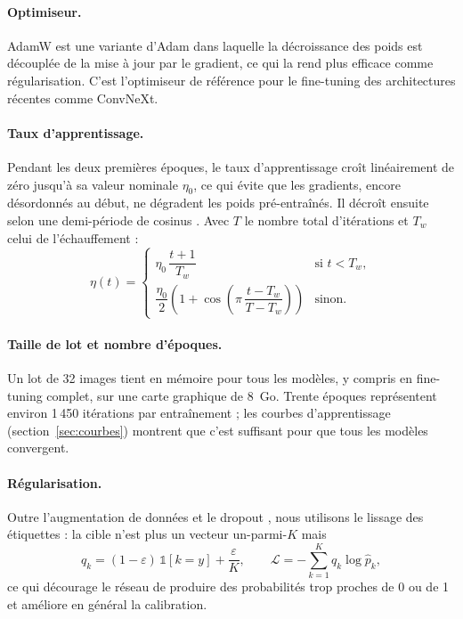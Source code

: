 \paragraph{Optimiseur.} AdamW \cite{loshchilov2019decoupled} est une variante d'Adam \cite{kingma2015adam} dans laquelle la décroissance des poids est découplée de la mise à jour par le gradient, ce qui la rend plus efficace comme régularisation. C'est l'optimiseur de référence pour le fine-tuning des architectures récentes comme ConvNeXt.

\paragraph{Taux d'apprentissage.} Pendant les deux premières époques, le taux d'apprentissage croît linéairement de zéro jusqu'à sa valeur nominale $\eta_0$, ce qui évite que les gradients, encore désordonnés au début, ne dégradent les poids pré-entraînés. Il décroît ensuite selon une demi-période de cosinus \cite{loshchilov2017sgdr}. Avec $T$ le nombre total d'itérations et $T_w$ celui de l'échauffement :
\begin{equation}
\eta(t) =
\begin{cases}
\eta_0\, \dfrac{t+1}{T_w} & \text{si } t < T_w,\\[2mm]
\dfrac{\eta_0}{2}\left(1 + \cos\left(\pi\,\dfrac{t - T_w}{T - T_w}\right)\right) & \text{sinon.}
\end{cases}
\label{eq:lr}
\end{equation}

\paragraph{Taille de lot et nombre d'époques.} Un lot de 32 images tient en mémoire pour tous les modèles, y compris en fine-tuning complet, sur une carte graphique de 8~Go. Trente époques représentent environ 1\,450 itérations par entraînement ; les courbes d'apprentissage (section~\ref{sec:courbes}) montrent que c'est suffisant pour que tous les modèles convergent.

\paragraph{Régularisation.} Outre l'augmentation de données et le dropout \cite{srivastava2014dropout}, nous utilisons le lissage des étiquettes \cite{szegedy2016rethinking} : la cible n'est plus un vecteur \og un-parmi-$K$ \fg{} mais
\begin{equation}
q_k = (1-\varepsilon)\,\mathbb{1}[k=y] + \frac{\varepsilon}{K}, \qquad \mathcal{L} = -\sum_{k=1}^{K} q_k \log \hat{p}_k ,
\label{eq:ls}
\end{equation}
ce qui décourage le réseau de produire des probabilités trop proches de 0 ou de 1 et améliore en général la calibration.

